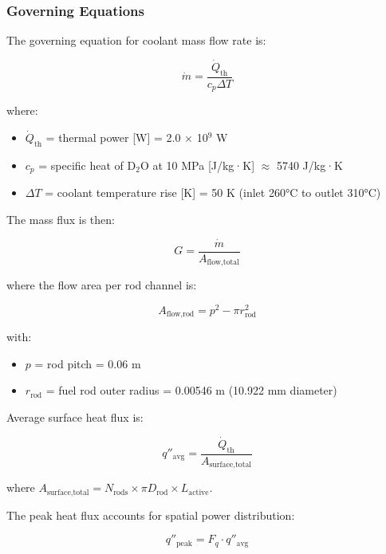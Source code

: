 \subsubsection{Governing Equations}

The governing equation for coolant mass flow rate is:

\begin{equation}
\dot{m} = \frac{\dot{Q}_{\text{th}}}{c_p \Delta T}
\end{equation}

where:
\begin{itemize}
    \item $\dot{Q}_{\text{th}}$ = thermal power [W] = 2.0 $\times$ 10$^9$ W
    \item $c_p$ = specific heat of D$_2$O at 10 MPa [J/kg·K] $\approx$ 5740 J/kg·K
    \item $\Delta T$ = coolant temperature rise [K] = 50 K (inlet 260°C to outlet 310°C)
\end{itemize}

The mass flux is then:

\begin{equation}
G = \frac{\dot{m}}{A_{\text{flow,total}}}
\end{equation}

where the flow area per rod channel is:

\begin{equation}
A_{\text{flow,rod}} = p^2 - \pi r_{\text{rod}}^2
\end{equation}

with:
\begin{itemize}
    \item $p$ = rod pitch = 0.06 m
    \item $r_{\text{rod}}$ = fuel rod outer radius = 0.00546 m (10.922 mm diameter)
\end{itemize}

Average surface heat flux is:

\begin{equation}
q''_{\text{avg}} = \frac{\dot{Q}_{\text{th}}}{A_{\text{surface,total}}}
\end{equation}

where $A_{\text{surface,total}} = N_{\text{rods}} \times \pi D_{\text{rod}} \times L_{\text{active}}$.

The peak heat flux accounts for spatial power distribution:

\begin{equation}
q''_{\text{peak}} = F_q \cdot q''_{\text{avg}}
\end{equation}

